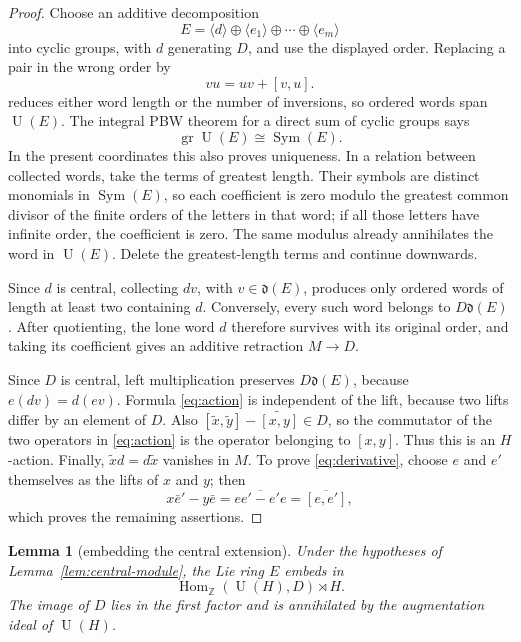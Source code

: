 \documentclass[10pt]{article}
\newtheorem{lemma}{Lemma}
\newcommand{\Z}{\mathbb Z}
\newcommand{\U}{\operatorname U}
\newcommand{\Hom}{\operatorname {Hom}}
\begin{document}
\begin{proof}
Choose an additive decomposition
\[
 E=\langle d\rangle\oplus\langle e_1\rangle\oplus\cdots
   \oplus\langle e_m\rangle
\]
into cyclic groups, with $d$ generating $D$, and use the displayed order.
Replacing a pair in the wrong order by
\[
                         vu=uv+[v,u].                     \tag{6}\label{eq:collect}
\]
reduces either word length or the number of inversions, so ordered words
span $\U(E)$.  The integral PBW theorem for a direct sum of cyclic groups
says
\[
                         \operatorname{gr}\U(E)\cong\operatorname{Sym}(E).
\]
In the present coordinates this also proves uniqueness.  In a relation
between collected words, take the terms of greatest length.  Their symbols
are distinct monomials in $\operatorname{Sym}(E)$, so each coefficient is
zero modulo the greatest common divisor of the finite orders of the letters
in that word; if all those letters have infinite order, the coefficient is
zero.  The same modulus already annihilates the word in $\U(E)$.
Delete the greatest-length terms and continue downwards.

Since $d$ is central, collecting $dv$, with $v\in\mathfrak d(E)$, produces
only ordered words of length at least two containing $d$.  Conversely, every
such word belongs to $D\mathfrak d(E)$.  After quotienting, the lone word
$d$ therefore survives with its original order, and taking its
coefficient gives an additive retraction $M\to D$.

Since $D$ is central, left multiplication preserves
$D\mathfrak d(E)$, because $e(dv)=d(ev)$.  Formula \eqref{eq:action} is
independent of the lift, because two lifts differ by an element of $D$.  Also
$[\widetilde x,\widetilde y]-\widetilde{[x,y]}\in D$, so the commutator of
the two operators in \eqref{eq:action} is the operator belonging to
$[x,y]$.  Thus this is an $H$-action.  Finally,
$\widetilde x d=d\widetilde x$ vanishes in $M$.  To prove
\eqref{eq:derivative}, choose $e$ and $e'$ themselves as the lifts of $x$
and $y$; then
\[
 x\bar e'-y\bar e=\overline{ee'-e'e}=\overline{[e,e']},
\]
which proves the remaining assertions.
\end{proof}

\begin{lemma}[embedding the central extension]\label{lem:central-embedding}
Under the hypotheses of Lemma~\ref{lem:central-module}, the Lie ring $E$
embeds in
\[
                         \Hom_{\Z}(\U(H),D)\rtimes H.
\]
The image of $D$ lies in the first factor and is annihilated by the
augmentation ideal of $\U(H)$.
\end{lemma}
\end{document}
